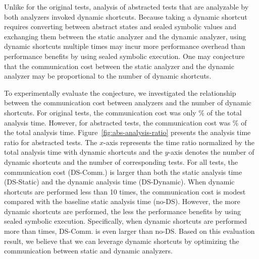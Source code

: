 Unlike for the original tests, analysis of 
abstracted tests that are analyzable by both analyzers invoked
 dynamic shortcuts.  Because taking a dynamic shortcut
requires converting between abstract states and sealed symbolic values
and exchanging them between the static analyzer and the dynamic analyzer,
using dynamic shortcuts multiple times may incur more performance
overhead than performance benefits by using sealed symbolic execution.
One may conjecture that the communication cost between the static
analyzer and the dynamic analyzer may be proportional to the number of
dynamic shortcuts.

To experimentally evaluate the conjecture, we investigated the relationship between
the communication cost between analyzers and the number of dynamic shortcuts.
For  original tests, the communication cost was only
\% of the total analysis time.  However, for 
abstracted tests, the communication cost was \% of the
total analysis time.  Figure~\ref{fig:abs-analysis-ratio} presents the
analysis time ratio for  abstracted tests.
The $x$-axis represents the time ratio normalized by the total analysis time with dynamic shortcuts
and the $y$-axis denotes the number of dynamic shortcuts and the number of corresponding tests.
For all  tests, the communication cost (DS-Comm.) is larger than
both the static analysis time (DS-Static) and the dynamic analysis
time (DS-Dynamic).  When dynamic shortcuts are performed less than 10 times,
the communication cost is modest compared with the baseline static
analysis time (no-DS).  However, the more dynamic shortcuts are performed,
the less the performance benefits by using sealed symbolic execution.
Specifically, when dynamic shortcuts are performed more than
 times, DS-Comm. is even larger than no-DS.
Based on this evaluation result, we believe that we can leverage
dynamic shortcuts by optimizing the communication between static and dynamic analyzers.

